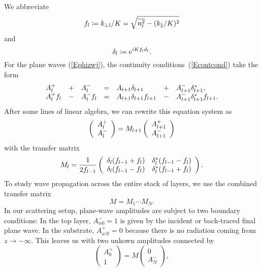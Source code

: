 We abbreviate
\begin{equation}
  f_l \coloneqq  k_{\perp l}/K = \sqrt{\overline{n_l^2}-(k_\parallel/K)^2}
\end{equation}
and
\begin{equation}
   \delta_l \coloneqq  \text{e}^{iKf_l d_l}.
\end{equation}
For the plane waves (\ref{Ephizwj}),
the continuity conditions~(\ref{Econtcond}) take the form
\begin{equation}\label{Econt2}
  \begin{array}{lclclcl}
  A^+_l &+& A^-_l
  &=&
  A_{l+1}\delta_{l+1} &+& A^-_{l+1}\delta_{l+1}^*,
  \\
  A^+_l f_l  &-& A^-_l f_l
  &=&
  A_{l+1}\delta_{l+1} f_{l+1} &-& A^-_{l+1}\delta_{l+1}^* f_{l+1}.
  \end{array}
\end{equation}
After some lines of linear algebra,
we can rewrite this equation system as
\begin{equation}\label{EcMc}
  \left( \begin{array}{c}A^+_l\\ A^-_l\end{array} \right)
  = M_{l+1} \left( \begin{array}{c}A^+_{l+1}\\A^-_{l+1}\end{array} \right)
\end{equation}
with the transfer matrix
\begin{equation}
  M_l
   = \frac{1}{2f_{l-1}}
   \left(\begin{array}{cc}
       \delta_l(f_{l-1}+f_l)&\delta_l^*(f_{l-1}-f_l)\\
       \delta_l(f_{l-1}-f_l)&\delta_l^*(f_{l-1}+f_l)
   \end{array}\right).
\end{equation}
To study wave propagation across the entire stack of layers,
we use the combined transfer matrix
\begin{equation}
   M = M_1 \cdots M_N.
\end{equation}
In our scattering setup,
plane-wave amplitudes are subject to two boundary conditions:
In the top layer, $A^-_{w0}=1$ is given by the
incident or back-traced final plane wave.
In the substrate, $A^+_{wN}=0$ because there is no radiation
coming from $z\to-\infty$.
This leaves us with two unkown amplitudes connected by
\begin{equation}
  \left( \begin{array}{c}A^+_0\\ 1\end{array} \right)
  = M \left( \begin{array}{c}0\\ A^-_N\end{array} \right),
\end{equation}
